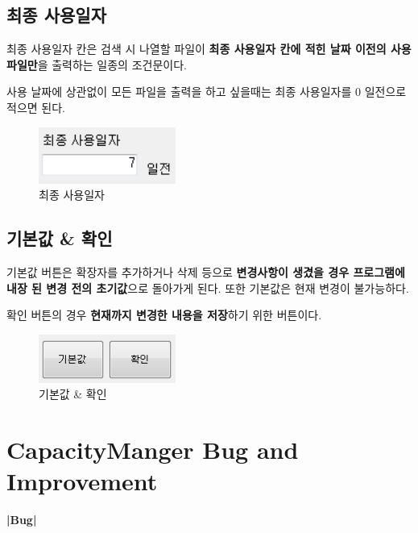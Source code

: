 \documentclass[a4paper, 13pt]{article} %
\begin{document}
		\newpage
	
		\subsection{최종 사용일자}	
		최종 사용일자 칸은 검색 시 나열할 파일이 \textbf{최종 사용일자 칸에 적힌 날짜 이전의 사용 파일만}을 출력하는 일종의 조건문이다.
		
		사용 날짜에 상관없이 모든 파일을 출력을 하고 싶을때는 최종 사용일자를 0 일전으로 적으면 된다.
		
		\begin{figure}[h]
			\centering
			\includegraphics[width=0.4\textwidth]{Figures/date}
			\caption{최종 사용일자}
			\label{fig:date}
		\end{figure}
	
		\newpage
	
		\subsection{기본값 \& 확인}
		기본값 버튼은 확장자를 추가하거나 삭제 등으로 \textbf{변경사항이 생겼을 경우 프로그램에 내장 된 변경 전의 초기값}으로 돌아가게 된다. 또한 기본값은 현재 변경이 불가능하다.
		
		확인 버튼의 경우 \textbf{현재까지 변경한 내용을 저장}하기 위한 버튼이다.
		
		\begin{figure}[h]
			\centering
			\includegraphics[width=0.4\textwidth]{Figures/button}
			\caption{기본값 \& 확인}
			\label{fig:button}
		\end{figure}
	
	\clearpage
	\section{CapacityManger Bug and Improvement}

		
		\LARGE \bf |Bug| \newline
		
\end{document}
